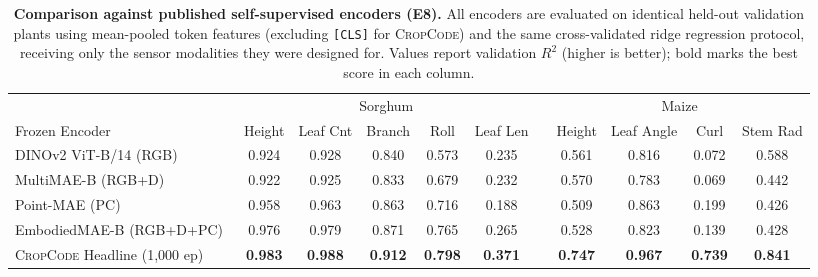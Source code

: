 \documentclass[10pt,twocolumn,letterpaper]{article}
\newcommand{\method}{\textsc{CropCode}}
\providecommand{\CropCode}{\textsc{CropCode}}
\begin{document}
\begin{table}[t]
  \caption{\textbf{Comparison against published self-supervised encoders (E8).} All encoders are evaluated on identical held-out validation plants using mean-pooled token features (excluding \texttt{[CLS]} for \method{}) and the same cross-validated ridge regression protocol, receiving only the sensor modalities they were designed for. Values report validation $R^2$ (higher is better); bold marks the best score in each column.}
  \label{tab:e8}\label{tab:baselines}
  \centering\scriptsize
  \setlength{\tabcolsep}{2.6pt}
  \begin{tabular}{l ccc cc c cccc}
    \toprule
    & \multicolumn{5}{c}{Sorghum} & & \multicolumn{4}{c}{Maize} \\
    \cmidrule(lr){2-6}\cmidrule(lr){8-11}
    Frozen Encoder & Height & Leaf Cnt & Branch & Roll & Leaf Len & & Height & Leaf Angle & Curl & Stem Rad \\
    \midrule
    DINOv2 ViT-B/14 (RGB)~\cite{oquab2024dinov2} & 0.924 & 0.928 & 0.840 & 0.573 & 0.235 & & 0.561 & 0.816 & 0.072 & 0.588 \\
    MultiMAE-B (RGB+D)~\cite{bachmann2022multimae} & 0.922 & 0.925 & 0.833 & 0.679 & 0.232 & & 0.570 & 0.783 & 0.069 & 0.442 \\
    Point-MAE (PC)~\cite{pang2022pointmae} & 0.958 & 0.963 & 0.863 & 0.716 & 0.188 & & 0.509 & 0.863 & 0.199 & 0.426 \\
    EmbodiedMAE-B (RGB+D+PC)~\cite{dong2025embodiedmae} & 0.976 & 0.979 & 0.871 & 0.765 & 0.265 & & 0.528 & 0.823 & 0.139 & 0.428 \\
    \CropCode{} Headline (1{,}000 ep) & \textbf{0.983} & \textbf{0.988} & \textbf{0.912} & \textbf{0.798} & \textbf{0.371} & & \textbf{0.747} & \textbf{0.967} & \textbf{0.739} & \textbf{0.841} \\
    \bottomrule
  \end{tabular}
\end{table}
\end{document}

